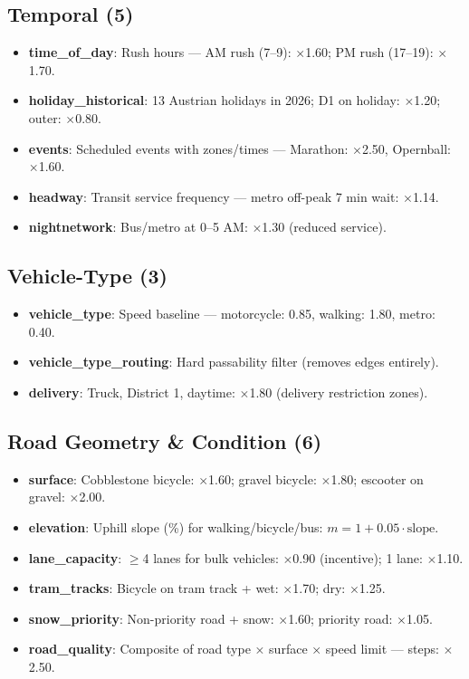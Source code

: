 \documentclass[11pt,a4paper]{article}
\begin{document}
\subsection{Temporal (5)}
\begin{itemize}[noitemsep]
  \item \textbf{time\_of\_day}: Rush hours — AM rush (7–9): $\times$1.60; PM rush (17–19): $\times$1.70.
  \item \textbf{holiday\_historical}: 13 Austrian holidays in 2026; D1 on holiday: $\times$1.20; outer: $\times$0.80.
  \item \textbf{events}: Scheduled events with zones/times — Marathon: $\times$2.50, Opernball: $\times$1.60.
  \item \textbf{headway}: Transit service frequency — metro off-peak 7 min wait: $\times$1.14.
  \item \textbf{nightnetwork}: Bus/metro at 0–5 AM: $\times$1.30 (reduced service).
\end{itemize}

\subsection{Vehicle-Type (3)}
\begin{itemize}[noitemsep]
  \item \textbf{vehicle\_type}: Speed baseline — motorcycle: 0.85, walking: 1.80, metro: 0.40.
  \item \textbf{vehicle\_type\_routing}: Hard passability filter (removes edges entirely).
  \item \textbf{delivery}: Truck, District 1, daytime: $\times$1.80 (delivery restriction zones).
\end{itemize}

\subsection{Road Geometry \& Condition (6)}
\begin{itemize}[noitemsep]
  \item \textbf{surface}: Cobblestone bicycle: $\times$1.60; gravel bicycle: $\times$1.80; escooter on gravel: $\times$2.00.
  \item \textbf{elevation}: Uphill slope (\%) for walking/bicycle/bus: $m = 1 + 0.05\cdot\text{slope}$.
  \item \textbf{lane\_capacity}: $\ge$4 lanes for bulk vehicles: $\times$0.90 (incentive); 1 lane: $\times$1.10.
  \item \textbf{tram\_tracks}: Bicycle on tram track + wet: $\times$1.70; dry: $\times$1.25.
  \item \textbf{snow\_priority}: Non-priority road + snow: $\times$1.60; priority road: $\times$1.05.
  \item \textbf{road\_quality}: Composite of road type × surface × speed limit — steps: $\times$2.50.
\end{itemize}
\end{document}

